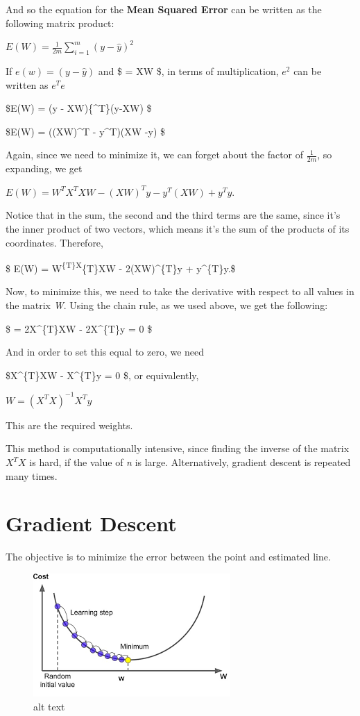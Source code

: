 \documentclass[11pt]{article}
\makeatletter
\def\maxwidth{\ifdim\Gin@nat@width>\linewidth\linewidth
    \else\Gin@nat@width\fi}
\let\Oldincludegraphics\includegraphics
\renewcommand{\includegraphics}[1]{\Oldincludegraphics[width=.8\maxwidth]{#1}}
\makeatother
\begin{document}
    And so the equation for the \textbf{Mean Squared Error} can be written
as the following matrix product:

\(E(W) = \frac{1}{2m} \sum_{i=1}^{m} (y - \hat{y})^2\)

If \(e(w) = (y-\hat{y})\) and \$ = XW \$, in terms of
multiplication, \(e^2\) can be written as \(e^{T}e\)

\$E(W) =  (y - XW)\{\^{}T\}(y-XW) \$

\$E(W) = ((XW)\^{}T - y\^{}T)(XW -y) \$

Again, since we need to minimize it, we can forget about the factor of
\(\frac{1}{2m}\), so expanding, we get

\(E(W) = W^{T}X^{T}XW - (XW)^{T}y - y^{T}(XW) + y^{T}y.\)

Notice that in the sum, the second and the third terms are the same,
since it's the inner product of two vectors, which means it's the sum of
the products of its coordinates. Therefore,

\$ E(W) = W\textsuperscript{\{T\}X}\{T\}XW - 2(XW)\^{}\{T\}y +
y\^{}\{T\}y.\$

Now, to minimize this, we need to take the derivative with respect to
all values in the matrix \emph{W}. Using the chain rule, as we used
above, we get the following:

\$  = 2X\^{}\{T\}XW - 2X\^{}\{T\}y = 0 \$

And in order to set this equal to zero, we need

\$X\^{}\{T\}XW - X\^{}\{T\}y = 0 \$, or equivalently,

\(W = (X^{T}X)^{-1}X^{T}y\)

This are the required weights.

This method is computationally intensive, since finding the inverse of
the matrix \(X^{T}X\) is hard, if the value of \emph{n} is large.
Alternatively, gradient descent is repeated many times.

    \hypertarget{gradient-descent}{%
\section{Gradient Descent}\label{gradient-descent}}

The objective is to minimize the error between the point and estimated
line.

\begin{figure}
\centering
\includegraphics{GD.png}
\caption{alt text}
\end{figure}
\end{document}
